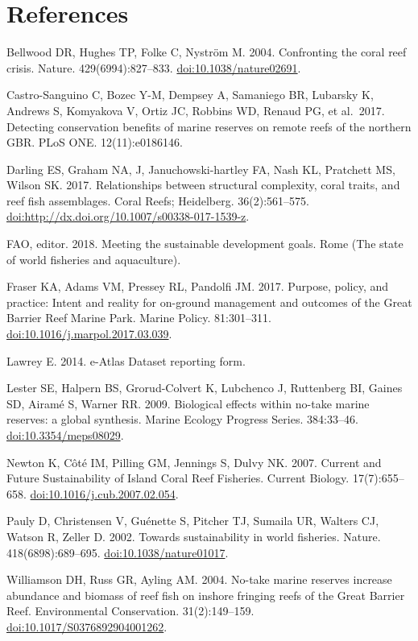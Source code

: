 \documentclass[12pt,]{article}
\begin{document}
\newpage

\hypertarget{references}{%
\section{References}\label{references}}

Bellwood DR, Hughes TP, Folke C, Nyström M. 2004. Confronting the coral
reef crisis. Nature. 429(6994):827--833. \url{doi:10.1038/nature02691}.

Castro-Sanguino C, Bozec Y-M, Dempsey A, Samaniego BR, Lubarsky K,
Andrews S, Komyakova V, Ortiz JC, Robbins WD, Renaud PG, et al.~2017.
Detecting conservation benefits of marine reserves on remote reefs of
the northern GBR. PLoS ONE. 12(11):e0186146.

Darling ES, Graham NA, J, Januchowski-hartley FA, Nash KL, Pratchett MS,
Wilson SK. 2017. Relationships between structural complexity, coral
traits, and reef fish assemblages. Coral Reefs; Heidelberg.
36(2):561--575. \url{doi:http://dx.doi.org/10.1007/s00338-017-1539-z}.

FAO, editor. 2018. Meeting the sustainable development goals. Rome (The
state of world fisheries and aquaculture).

Fraser KA, Adams VM, Pressey RL, Pandolfi JM. 2017. Purpose, policy, and
practice: Intent and reality for on-ground management and outcomes of
the Great Barrier Reef Marine Park. Marine Policy. 81:301--311.
\url{doi:10.1016/j.marpol.2017.03.039}.

Lawrey E. 2014. e-Atlas Dataset reporting form.

Lester SE, Halpern BS, Grorud-Colvert K, Lubchenco J, Ruttenberg BI,
Gaines SD, Airamé S, Warner RR. 2009. Biological effects within no-take
marine reserves: a global synthesis. Marine Ecology Progress Series.
384:33--46. \url{doi:10.3354/meps08029}.

Newton K, Côté IM, Pilling GM, Jennings S, Dulvy NK. 2007. Current and
Future Sustainability of Island Coral Reef Fisheries. Current Biology.
17(7):655--658. \url{doi:10.1016/j.cub.2007.02.054}.

Pauly D, Christensen V, Guénette S, Pitcher TJ, Sumaila UR, Walters CJ,
Watson R, Zeller D. 2002. Towards sustainability in world fisheries.
Nature. 418(6898):689--695. \url{doi:10.1038/nature01017}.

Williamson DH, Russ GR, Ayling AM. 2004. No-take marine reserves
increase abundance and biomass of reef fish on inshore fringing reefs of
the Great Barrier Reef. Environmental Conservation. 31(2):149--159.
\url{doi:10.1017/S0376892904001262}.
\end{document}
